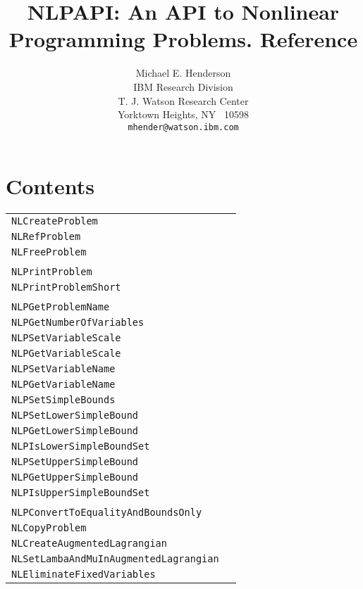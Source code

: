 \documentclass[12pt]{article}
\title{NLPAPI: An API to Nonlinear Programming Problems. {\bf Reference}}
\author{
  Michael E. Henderson\\[.5\baselineskip]
  IBM Research Division\\
  T. J. Watson Research Center\\
  Yorktown Heights, NY ~10598\\
  {\tt mhender@watson.ibm.com}
 }
\begin{document}
  \maketitle

\section{Contents}

\begin{center}
\begin{tabular}{ll}
\tt NLCreateProblem&\pageref{Subroutine:NLCreateProblem}\\
\tt NLRefProblem&\pageref{Subroutine:NLRefProblem}\\
\tt NLFreeProblem&\pageref{Subroutine:NLFreeProblem}\\
\\
\tt NLPrintProblem&\pageref{Subroutine:NLPrintProblem}\\
\tt NLPrintProblemShort&\pageref{Subroutine:NLPrintProblemShort}\\
\\
\tt NLPGetProblemName&\pageref{Subroutine:NLPGetProblemName}\\
\tt NLPGetNumberOfVariables&\pageref{Subroutine:NLPGetNumberOfVariables}\\
\tt NLPSetVariableScale&\pageref{Subroutine:NLPSetVariableScale}\\
\tt NLPGetVariableScale&\pageref{Subroutine:NLPGetVariableScale}\\
\tt NLPSetVariableName&\pageref{Subroutine:NLPSetVariableName}\\
\tt NLPGetVariableName&\pageref{Subroutine:NLPGetVariableName}\\
\tt NLPSetSimpleBounds&\pageref{Subroutine:NLPSetSimpleBounds}\\
\tt NLPSetLowerSimpleBound&\pageref{Subroutine:NLPSetLowerSimpleBound}\\
\tt NLPGetLowerSimpleBound&\pageref{Subroutine:NLPGetLowerSimpleBound}\\
\tt NLPIsLowerSimpleBoundSet&\pageref{Subroutine:NLPIsLowerSimpleBoundSet}\\
\tt NLPSetUpperSimpleBound&\pageref{Subroutine:NLPSetUpperSimpleBound}\\
\tt NLPGetUpperSimpleBound&\pageref{Subroutine:NLPGetUpperSimpleBound}\\
\tt NLPIsUpperSimpleBoundSet&\pageref{Subroutine:NLPIsUpperSimpleBoundSet}\\
\\
\tt NLPConvertToEqualityAndBoundsOnly&\pageref{Subroutine:NLPConvertToEqualityAndBoundsOnly}\\
\tt NLCopyProblem&\pageref{Subroutine:NLCopyProblem}\\
\tt NLCreateAugmentedLagrangian&\pageref{Subroutine:NLCreateAugmentedLagrangian}\\
\tt NLSetLambaAndMuInAugmentedLagrangian&\pageref{Subroutine:NLSetLambaAndMuInAugmentedLagrangian}\\
\tt NLEliminateFixedVariables&\pageref{Subroutine:NLEliminateFixedVariables}\\
\end{tabular}
\end{center}
\newpage
\end{document}
